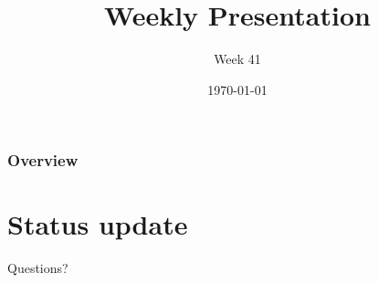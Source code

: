 \documentclass{beamer}
\title{Weekly Presentation}
\subtitle{Week 41}
\author{}
\institute{Luleå University of Technology}
\date{\today}
\begin{document}
\begin{frame}
    \titlepage
\end{frame}

\begin{frame}
    \frametitle{Overview}
    \tableofcontents
\end{frame}

\section{Status update}









\begin{frame}
    \begin{center}
        \Huge Questions?
    \end{center}
\end{frame}
\end{document}
